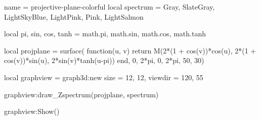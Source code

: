 \documentclass{standalone}
\begin{document}
\begin{luadraw}{name = projective-plane-colorful}
local spectrum = {Gray, SlateGray, LightSkyBlue, LightPink, Pink, LightSalmon}

local pi, sin, cos, tanh = math.pi, math.sin, math.cos, math.tanh

local projplane = surface(
  function(u, v)
    return M(2*(1 + cos(v))*cos(u), 2*(1 + cos(v))*sin(u), 2*sin(v)*tanh(u-pi))
  end,
  0, 2*pi, 0,  2*pi,
  {50, 30})

local graphview = graph3d:new{
  size    = {12, 12},
  viewdir = {120, 55}
}

graphview:draw_Zspectrum(projplane, spectrum)

graphview:Show()
\end{luadraw}
\end{document}
